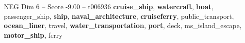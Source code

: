\begin{textsample}{NEG Dim 6 – Score -9.00 – t006936}  \label{ex:f6_neg_017}
\textbf{cruise\_ship}, \textbf{watercraft}, \textbf{boat}, passenger\_ship, \textbf{ship}, \textbf{naval\_architecture}, \textbf{cruiseferry}, public\_transport, \textbf{ocean\_liner}, travel, \textbf{water\_transportation}, \textbf{port}, deck, ms\_island\_escape, \textbf{motor\_ship}, ferry

\end{textsample}
